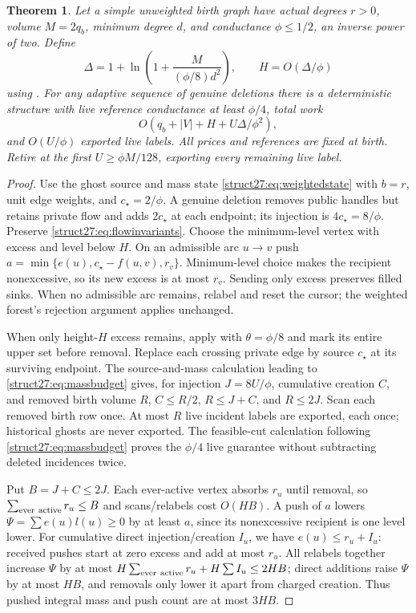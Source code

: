 \documentclass[11pt]{article}
\newtheorem{theorem}{Theorem}[section]
\theoremstyle{remark}
\begin{document}
\begin{theorem}\label{struct27:thm:unweighted}
Let a simple unweighted birth graph have actual degrees $r>0$, volume $M=2q_b$,
minimum degree $d$, and conductance $\phi\le1/2$, an inverse power of two.
Define
\[
 \Delta=1+\ln\left(1+\frac{M}{(\phi/8)d^2}\right),\qquad
 H=O(\Delta/\phi)
\]
using .
For any adaptive sequence of genuine deletions there is a deterministic
structure with live reference conductance at least $\phi/4$, total work
\[
 O(q_b+|V|+H+U\Delta/\phi^2),
\]
and $O(U/\phi)$ exported live labels.
All prices and references are fixed at birth.
Retire at the first $U\ge \phi M/128 $, exporting every remaining
live label.
\end{theorem} \begin{proof} Use the ghost source and mass state
\eqref{struct27:eq:weightedstate} with $b=r$, unit edge weights, and $c_\star=2/\phi$.
A genuine deletion removes public handles but retains private flow and adds $2c_\star$
at each endpoint; its injection is $4c_\star=8/\phi$.
Preserve \eqref{struct27:eq:flowinvariants}.
Choose the minimum-level vertex with excess and level below $H$.
On an admissible arc $u\to v$ push $a=\min\{e(u),c_\star-f(u,v),r_v\}$.
Minimum-level choice makes the recipient nonexcessive, so its new excess is at
most $r_v$.
Sending only excess preserves filled sinks.
When no admissible arc remains, relabel and reset the cursor; the weighted
forest's rejection argument applies unchanged.

When only height-$H$ excess remains, apply 
with $\theta=\phi/8$ and mark its entire upper set before removal.
Replace each crossing private edge by source $c_\star$ at its surviving endpoint.
The source-and-mass calculation leading to \eqref{struct27:eq:massbudget} gives,
for injection $J=8U/\phi$, cumulative creation $C$, and removed birth volume
$R$, $C\le R/2$, $R\le J+C$, and $R\le2J$.
Scan each removed birth row once.
At most $R$ live incident labels are exported, each once; historical ghosts are
never exported.
The feasible-cut calculation following \eqref{struct27:eq:massbudget} proves the
$\phi/4$ live guarantee without subtracting deleted incidences twice.

Put $B=J+C\le2J$.
Each ever-active vertex absorbs $r_u$ until removal, so $\sum_{\rm ever\
active}r_u\le B$ and scans/relabels cost $O(HB)$.
A push of $a$ lowers $\Psi=\sum e(u)l(u)\ge0$ by at least $a$, since its
nonexcessive recipient is one level lower.
For cumulative direct injection/creation $I_u$, we have $e(u)\le r_u+I_u$:
received pushes start at zero excess and add at most $r_u$.
All relabels together increase $\Psi$ by at most $H\sum_{\rm ever\
active}r_u+H\sum I_u\le2HB$; direct additions raise $\Psi$ by at most $HB$, and
removals only lower it apart from charged creation.
Thus pushed integral mass and push count are at most $3HB$.


\end{proof}
\end{document}
